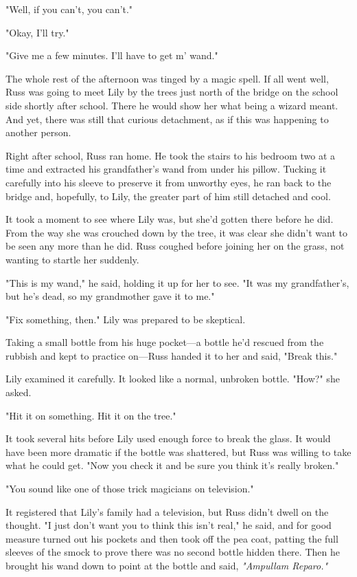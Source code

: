"Well, if you can't, you can't."

"Okay, I'll try."

"Give me a few minutes. I'll have to get m' wand."

The whole rest of the afternoon was tinged by a magic spell. If all went well, Russ was going to meet Lily by the trees just north of the bridge on the school side shortly after school. There he would show her what being a wizard meant. And yet, there was still that curious detachment, as if this was happening to another person.

Right after school, Russ ran home. He took the stairs to his bedroom two at a time and extracted his grandfather's wand from under his pillow. Tucking it carefully into his sleeve to preserve it from unworthy eyes, he ran back to the bridge and, hopefully, to Lily, the greater part of him still detached and cool.

It took a moment to see where Lily was, but she'd gotten there before he did. From the way she was crouched down by the tree, it was clear she didn't want to be seen any more than he did. Russ coughed before joining her on the grass, not wanting to startle her suddenly.

"This is my wand," he said, holding it up for her to see. "It was my grandfather's, but he's dead, so my grandmother gave it to me."

"Fix something, then." Lily was prepared to be skeptical.

Taking a small bottle from his huge pocket—a bottle he'd rescued from the rubbish and kept to practice on—Russ handed it to her and said, "Break this."

Lily examined it carefully. It looked like a normal, unbroken bottle. "How?" she asked.

"Hit it on something. Hit it on the tree."

It took several hits before Lily used enough force to break the glass. It would have been more dramatic if the bottle was shattered, but Russ was willing to take what he could get. "Now you check it and be sure you think it's really broken."

"You sound like one of those trick magicians on television."

It registered that Lily's family had a television, but Russ didn't dwell on the thought. "I just don't want you to think this isn't real," he said, and for good measure turned out his pockets and then took off the pea coat, patting the full sleeves of the smock to prove there was no second bottle hidden there. Then he brought his wand down to point at the bottle and said, \emph{"Ampullam Reparo."}

